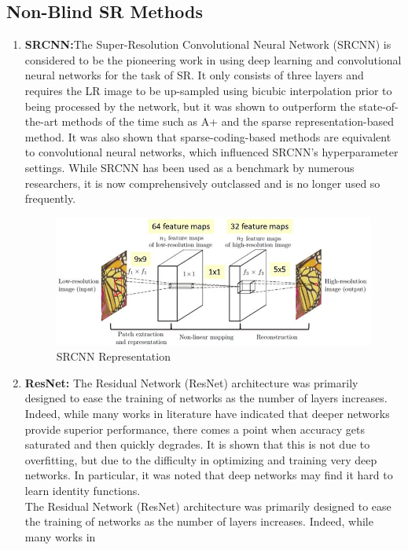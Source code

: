 \subsection{Non-Blind SR Methods}
\begin{enumerate}
    \item {\bf SRCNN:}The Super-Resolution Convolutional Neural Network (SRCNN) is considered to be the
    pioneering work in using deep learning and convolutional neural networks for the task of SR. It only consists of three layers and requires the LR image to be up-sampled using
    bicubic interpolation prior to being processed by the network, but it was shown to outperform the state-of-the-art methods of the time such as A+ and the sparse representation-based method. It was also shown that sparse-coding-based methods are equivalent to convolutional neural networks, which influenced SRCNN’s hyperparameter settings. While SRCNN has been used as a benchmark by numerous researchers, it is now comprehensively outclassed and is no longer used so frequently.
    \begin{figure}[ht]
        \centering
        \includegraphics[width=5in]{./figures/srcnn.jpg}
        \caption{SRCNN Representation}
    \end{figure}
    \item {\bf ResNet:} The Residual Network (ResNet) architecture was primarily designed to ease the
    training of networks as the number of layers increases. Indeed, while many works in
    literature have indicated that deeper networks provide superior performance, there
    comes a point when accuracy gets saturated and then quickly degrades. It is shown that
    this is not due to overfitting, but due to the difficulty in optimizing and training very
    deep networks. In particular, it was noted that deep networks may find it hard to learn
    identity functions.\\
    The Residual Network (ResNet) architecture was primarily designed to ease the
    training of networks as the number of layers increases. Indeed, while many works in

\end{enumerate}
